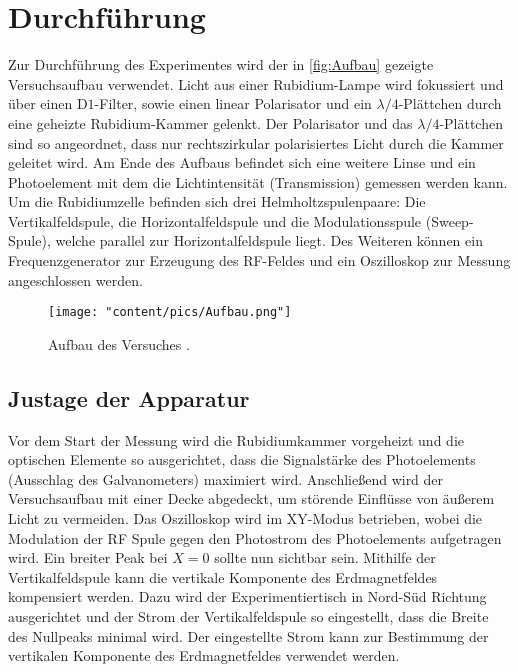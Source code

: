 \section{Durchführung}
\label{sec:Durchführung}
Zur Durchführung des Experimentes wird der in \autoref{fig:Aufbau} gezeigte Versuchsaufbau verwendet. Licht aus einer Rubidium-Lampe wird fokussiert und über einen 
$\text{D}1$-Filter, sowie einen linear Polarisator und ein $\lambda/4$-Plättchen durch eine geheizte Rubidium-Kammer gelenkt.
Der Polarisator und das $\lambda/4$-Plättchen sind so angeordnet, dass nur rechtszirkular polarisiertes Licht durch die Kammer geleitet wird.
Am Ende des Aufbaus befindet sich eine weitere Linse und ein Photoelement mit dem die Lichtintensität (Transmission) gemessen werden kann.
Um die Rubidiumzelle befinden sich drei Helmholtzspulenpaare: Die Vertikalfeldspule, die Horizontalfeldspule und die Modulationsspule (Sweep-Spule),
welche parallel zur Horizontalfeldspule liegt.
Des Weiteren können ein Frequenzgenerator zur Erzeugung des RF-Feldes und ein Oszilloskop zur Messung angeschlossen werden.
\begin{figure}
    \centering
    \texttt{[image: "content/pics/Aufbau.png"]}
    \caption{Aufbau des Versuches \cite{v21}.}
    \label{fig:Aufbau}
\end{figure}

\subsection{Justage der Apparatur}
Vor dem Start der Messung wird die Rubidiumkammer vorgeheizt und die optischen Elemente so ausgerichtet, dass die Signalstärke des Photoelements
(Ausschlag des Galvanometers) maximiert wird. Anschließend wird der Versuchsaufbau mit einer Decke abgedeckt, um störende Einflüsse von äußerem Licht zu vermeiden.
Das Oszilloskop wird im XY-Modus betrieben, wobei die Modulation der RF Spule gegen den Photostrom des Photoelements aufgetragen wird. Ein breiter Peak bei 
$X = 0$ sollte nun sichtbar sein.
Mithilfe der Vertikalfeldspule kann die vertikale Komponente des Erdmagnetfeldes kompensiert werden. Dazu wird der Experimentiertisch in Nord-Süd Richtung 
ausgerichtet und der Strom der Vertikalfeldspule so eingestellt, dass die Breite des Nullpeaks minimal wird. Der eingestellte Strom kann zur Bestimmung der 
vertikalen Komponente des Erdmagnetfeldes verwendet werden.

